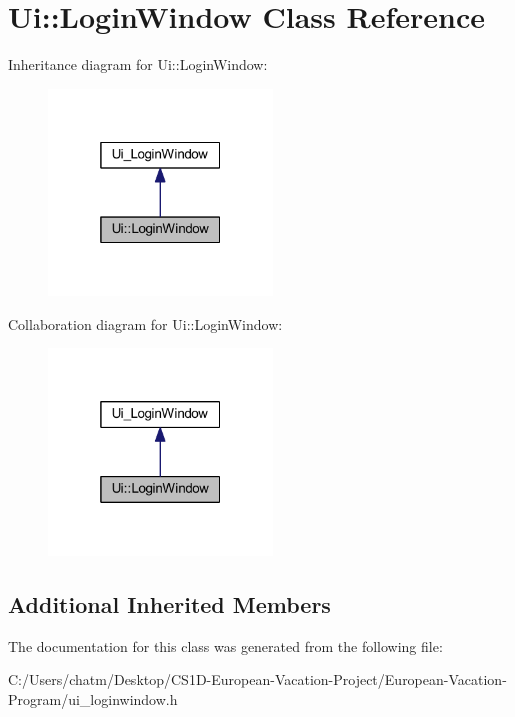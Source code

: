 \hypertarget{class_ui_1_1_login_window}{}\section{Ui\+::Login\+Window Class Reference}
\label{class_ui_1_1_login_window}


Inheritance diagram for Ui\+::Login\+Window\+:
\nopagebreak
\begin{figure}[H]
\begin{center}
\leavevmode
\includegraphics[width=169pt]{class_ui_1_1_login_window__inherit__graph}
\end{center}
\end{figure}


Collaboration diagram for Ui\+::Login\+Window\+:
\nopagebreak
\begin{figure}[H]
\begin{center}
\leavevmode
\includegraphics[width=169pt]{class_ui_1_1_login_window__coll__graph}
\end{center}
\end{figure}
\subsection*{Additional Inherited Members}


The documentation for this class was generated from the following file\+:\begin{DoxyCompactItemize}
\item 
C\+:/\+Users/chatm/\+Desktop/\+C\+S1\+D-\/\+European-\/\+Vacation-\/\+Project/\+European-\/\+Vacation-\/\+Program/ui\+\_\+loginwindow.\+h\end{DoxyCompactItemize}
